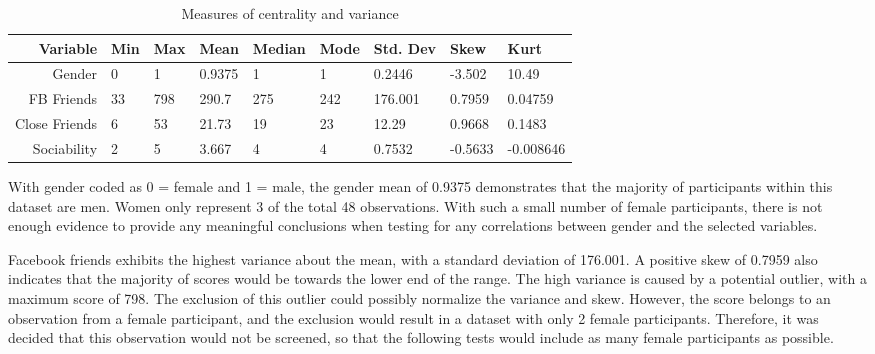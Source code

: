 \begin{table}[H]
\centering
\caption{Measures of centrality and variance}
\begin{tabular}{r|l|l|l|l|l|l|l|l}
Variable      & Min & Max & Mean   & Median & Mode & Std. Dev & Skew    & Kurt      \\ \hline
Gender        & 0   & 1   & 0.9375 & 1      & 1    & 0.2446   & -3.502  & 10.49     \\ \hline
FB Friends    & 33  & 798 & 290.7  & 275    & 242  & 176.001  & 0.7959  & 0.04759   \\ \hline
Close Friends & 6   & 53  & 21.73  & 19     & 23   & 12.29    & 0.9668  & 0.1483    \\ \hline
Sociability   & 2   & 5   & 3.667  & 4      & 4    & 0.7532   & -0.5633 & -0.008646 \\ \hline
\end{tabular}
\end{table}



With gender coded as 0 = female and 1 = male, the gender mean of 0.9375 demonstrates that the majority of participants within this dataset are men. Women only represent 3 of the total 48 observations. With such a small number of female participants, there is not enough evidence to provide any meaningful conclusions when testing for any correlations between gender and the selected variables.

Facebook friends exhibits the highest variance about the mean, with a standard deviation of 176.001. A positive skew of 0.7959 also indicates that the majority of scores would be towards the lower end of the range. The high variance is caused by a potential outlier, with a maximum score of 798. The exclusion of this outlier could possibly normalize the variance and skew. However, the score belongs to an observation from a female participant, and the exclusion would result in a dataset with only 2 female participants. Therefore, it was decided that this observation would not be screened, so that the following tests would include as many female participants as possible.

